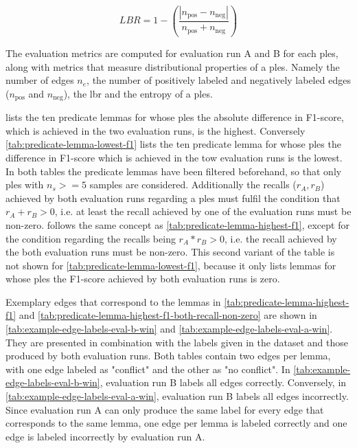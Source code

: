 \documentclass[11pt, numbers=noenddot]{scrreprt}
\begin{document}
\begin{equation}
LBR = 1 - \left(\frac{\left|n_{\text{pos}} - n_{\text{neg}}\right|}{n_{\text{pos}} + n_{\text{neg}}}\right)
\label{eq:label-balance-ratio}
\end{equation}

The evaluation metrics are computed for evaluation run A and B for each \gls{ples}, along with metrics that measure distributional properties of a \gls{ples}. Namely the number of edges \(n_e\), the number of positively labeled and negatively labeled edges (\(n_\text{pos}\) and \(n_\text{neg}\)), the \gls{lbr}  and the entropy of a \gls{ples}.

 lists the ten predicate lemmas for whose \gls{ples} the absolute difference in F1-score, which is achieved in the two evaluation runs, is the highest. Conversely \cref{tab:predicate-lemma-lowest-f1} lists the ten predicate lemma for whose \gls{ples} the difference in F1-score which is achieved in the tow evaluation runs is the lowest. In both tables the predicate lemmas have been filtered beforehand, so that only \gls{ples} with \(n_s >= 5\) samples are considered. Additionally the recalls (\(r_A, r_B\)) achieved by both evaluation runs regarding a \gls{ples} must fulfil the condition that \(r_A + r_B > 0\), i.e. at least the recall achieved by one of the evaluation runs must be non-zero.  follows the same concept as \cref{tab:predicate-lemma-highest-f1}, except for the condition regarding the recalls being \(r_A * r_B > 0\), i.e. the recall achieved by the both evaluation runs must be non-zero. This second variant of the table is not shown for \cref{tab:predicate-lemma-lowest-f1}, because it only lists lemmas for whose \gls{ples} the F1-score achieved by both evaluation runs is zero.

Exemplary edges that correspond to the lemmas in \cref{tab:predicate-lemma-highest-f1} and \cref{tab:predicate-lemma-highest-f1-both-recall-non-zero} are shown in \cref{tab:example-edge-labels-eval-b-win} and  \cref{tab:example-edge-labels-eval-a-win}. They are presented in combination with the labels given in the dataset and those produced by both evaluation runs. Both tables contain two edges per lemma, with one edge labeled as "conflict" and the other as "no conflict". In \cref{tab:example-edge-labels-eval-b-win}, evaluation run B labels all edges correctly. Conversely, in \cref{tab:example-edge-labels-eval-a-win}, evaluation run B labels all edges incorrectly. Since evaluation run A can only produce the same label for every edge that corresponds to the same lemma, one edge per lemma is labeled correctly and one edge is labeled incorrectly by evaluation run A.
\end{document}
